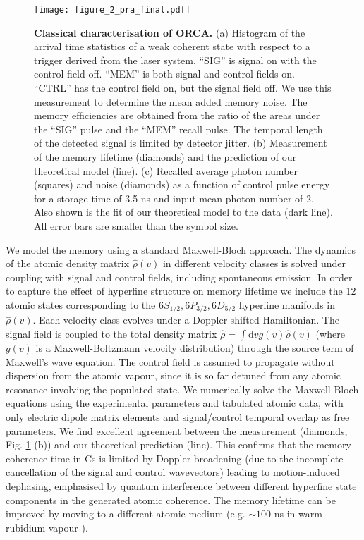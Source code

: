 \documentclass[%
 reprint,
 amsmath,amssymb,
 aps,
 pra,
]{revtex4-1}
\begin{document}
\begin{figure}[h]
\centering
\texttt{[image: figure\_2\_pra\_final.pdf]}
\caption{\textbf{Classical characterisation of ORCA.}
%
(a) Histogram of the arrival time statistics of a weak coherent state with respect to a trigger derived from the laser system. ``SIG'' is signal on with the control field off. ``MEM'' is both signal and control fields on. ``CTRL'' has the control field on, but the signal field off. We use this measurement to determine the mean added memory noise. The memory efficiencies are obtained from the ratio of the areas under the ``SIG'' pulse and the ``MEM'' recall pulse. The temporal length of the detected signal is limited by detector jitter.
%
(b) Measurement of the memory lifetime (diamonds) and the prediction of our theoretical model (line).
%
(c) Recalled average photon number (squares) and noise (diamonds) as a function of control pulse energy for a storage time of 3.5 ns and input mean photon number of 2. Also shown is the fit of our theoretical model to the data (dark line). All error bars are smaller than the symbol size.
%
%
}
\label{fig:characterisation}
\end{figure}

We model the memory using a standard Maxwell-Bloch approach. The dynamics of the atomic density matrix $\hat{\rho}(v)$ in different velocity classes is solved under coupling with signal and control fields, including spontaneous emission. In order to capture the effect of hyperfine structure on memory lifetime we include the 12 atomic states corresponding to the $6S_{1/2}, 6P_{3/2}, 6D_{5/2}$ hyperfine manifolds in $\hat{\rho}(v)$. Each velocity class evolves under a Doppler-shifted Hamiltonian. The signal field is coupled to the total density matrix $\hat{\rho}=\int \mathrm{d}v g(v) \hat{\rho}(v)$ (where $g(v)$ is a Maxwell-Boltzmann velocity distribution) through the source term of Maxwell's wave equation. The control field is assumed to propagate without dispersion from the atomic vapour, since it is so far detuned from any atomic resonance involving the populated state. We numerically solve the Maxwell-Bloch equations using the experimental parameters and tabulated atomic data, with only electric dipole matrix elements and signal/control temporal overlap as free parameters. We find excellent agreement between the measurement (diamonds, Fig. \ref{fig:characterisation} (b)) and our theoretical prediction (line). This confirms that the memory coherence time in Cs is limited by Doppler broadening (due to the incomplete cancellation of the signal and control wavevectors) leading to motion-induced dephasing, emphasised by quantum interference between different hyperfine state components in the generated atomic coherence. The memory lifetime can be improved by moving to a different atomic medium (e.g. $\sim100$ ns in warm rubidium vapour \cite{SuppMat,Finkelstein2017}).
\end{document}
